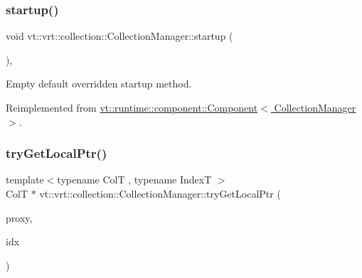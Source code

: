 \mbox{\label{structvt_1_1vrt_1_1collection_1_1_collection_manager_ac71095016a20dd9607f2f937bf35305e}} 
\subsubsection{\texorpdfstring{startup()}{startup()}}
{\footnotesize\ttfamily void vt\+::vrt\+::collection\+::\+Collection\+Manager\+::startup (\begin{DoxyParamCaption}{ }\end{DoxyParamCaption})\hspace{0.3cm}{\ttfamily [override]}, {\ttfamily [virtual]}}



Empty default overridden startup method. 



Reimplemented from \hyperlink{structvt_1_1runtime_1_1component_1_1_component_aad3974307ab3b2e1df389a91310f68c2}{vt\+::runtime\+::component\+::\+Component$<$ Collection\+Manager $>$}.

\mbox{\label{structvt_1_1vrt_1_1collection_1_1_collection_manager_a09bd0e2b03bd5f638bdc44f7ffeef715}} 
\subsubsection{\texorpdfstring{try\+Get\+Local\+Ptr()}{tryGetLocalPtr()}}
{\footnotesize\ttfamily template$<$typename ColT , typename IndexT $>$ \\
ColT $\ast$ vt\+::vrt\+::collection\+::\+Collection\+Manager\+::try\+Get\+Local\+Ptr (\begin{DoxyParamCaption}\item[{\hyperlink{structvt_1_1vrt_1_1collection_1_1_collection_manager_a56458ed7f9bb22b631b9b3a745f42f94}{Collection\+Proxy\+Wrap\+Type}$<$ ColT, IndexT $>$ const \&}]{proxy,  }\item[{IndexT}]{idx }\end{DoxyParamCaption})}



